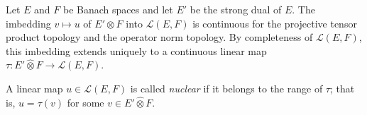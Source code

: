 Let $E$ and $F$ be Banach spaces and let $E'$ be the strong dual of $E$. The imbedding $v \mapsto u$ of $E' \otimes F$ into $\mathcal{L}(E, F)$ is continuous for the projective tensor product topology and the operator norm topology. By completeness of $\mathcal{L}(E, F)$, this imbedding extends uniquely to a continuous linear map $\tau: E' \mathbin{\widehat{\otimes}} F \to \mathcal{L}(E, F)$.

A linear map $u \in \mathcal{L}(E, F)$ is called \textit{nuclear} if it belongs to the range of $\tau$; that is, $u = \tau(v)$ for some $v \in E' \mathbin{\widehat{\otimes}} F$.
